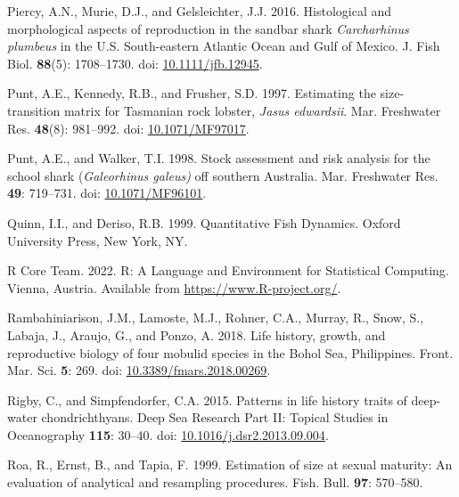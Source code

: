 \documentclass[
]{article}
\newenvironment{CSLReferences}%
  {}%
  {\par}
\begin{document}
\begin{CSLReferences}{1}{0}
Piercy, A.N., Murie, D.J., and Gelsleichter, J.J. 2016. Histological and morphological aspects of reproduction in the sandbar shark \emph{{Carcharhinus} plumbeus} in the {U}.{S}. South-eastern {Atlantic} {Ocean} and {Gulf} of {Mexico}. J. Fish Biol. \textbf{88}(5): 1708--1730. doi: \href{https://doi.org/10.1111/jfb.12945}{10.1111/jfb.12945}.

Punt, A.E., Kennedy, R.B., and Frusher, S.D. 1997. Estimating the size-transition matrix for {Tasmanian} rock lobster, \emph{{Jasus} edwardsii}. Mar. Freshwater Res. \textbf{48}(8): 981--992. doi: \href{https://doi.org/10.1071/MF97017}{10.1071/MF97017}.

Punt, A.E., and Walker, T.I. 1998. Stock assessment and risk analysis for the school shark (\emph{{Galeorhinus} galeus)} off southern {Australia}. Mar. Freshwater Res. \textbf{49}: 719--731. doi: \href{https://doi.org/10.1071/MF96101}{10.1071/MF96101}.

Quinn, I.I., and Deriso, R.B. 1999. Quantitative {Fish} {Dynamics}. Oxford University Press, New York, NY.

R Core Team. 2022. R: {A} {Language} and {Environment} for {Statistical} {Computing}. Vienna, Austria. Available from \url{https://www.R-project.org/}.

Rambahiniarison, J.M., Lamoste, M.J., Rohner, C.A., Murray, R., Snow, S., Labaja, J., Araujo, G., and Ponzo, A. 2018. Life history, growth, and reproductive biology of four mobulid species in the {Bohol} {Sea}, {Philippines}. Front. Mar. Sci. \textbf{5}: 269. doi: \href{https://doi.org/10.3389/fmars.2018.00269}{10.3389/fmars.2018.00269}.

Rigby, C., and Simpfendorfer, C.A. 2015. Patterns in life history traits of deep-water chondrichthyans. Deep Sea Research Part II: Topical Studies in Oceanography \textbf{115}: 30--40. doi: \href{https://doi.org/10.1016/j.dsr2.2013.09.004}{10.1016/j.dsr2.2013.09.004}.

Roa, R., Ernst, B., and Tapia, F. 1999. Estimation of size at sexual maturity: An evaluation of analytical and resampling procedures. Fish. Bull. \textbf{97}: 570--580.


\end{CSLReferences}
\end{document}
